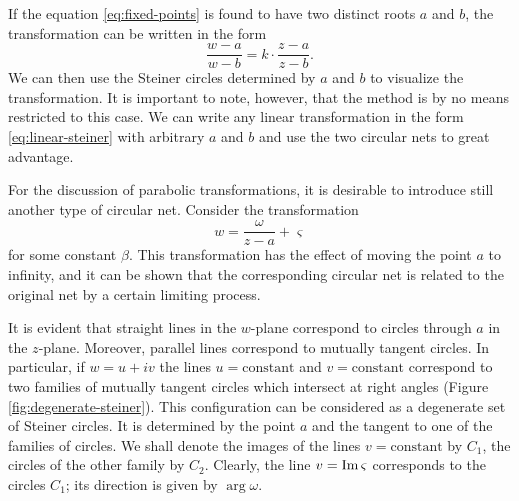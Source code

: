 If the equation \ref{eq:fixed-points} is found to have two distinct roots $a$ and $b$, the transformation can be written in the form $$\dfrac{w-a}{w-b}=k \cdot \dfrac{z-a}{z-b}.$$ We can then use the Steiner circles determined by $a$ and $b$ to visualize the transformation. It is important to note, however, that the method is by no means restricted to this case. We can write any linear transformation in the form \ref{eq:linear-steiner} with arbitrary $a$ and $b$ and use the two circular nets to great advantage.

For the discussion of parabolic transformations, it is desirable to introduce still another type of circular net. Consider the transformation $$w=\dfrac{\omega}{z-a}+\varsigma$$ for some constant $\beta$. This transformation has the effect of moving the point $a$ to infinity, and it can be shown that the corresponding circular net is related to the original net by a certain limiting process.

It is evident that straight lines in the $w$-plane correspond to circles through $a$ in the $z$-plane. Moreover, parallel lines correspond to mutually tangent circles. In particular, if $w=u+iv$ the lines $u=\text{constant}$ and $v=\text{constant}$ correspond to two families of mutually tangent circles which intersect at right angles (Figure \ref{fig:degenerate-steiner}). This configuration can be considered as a degenerate set of Steiner circles. It is determined by the point $a$ and the tangent to one of the families of circles. We shall denote the images of the lines $v=\text{constant}$ by $C_1$, the circles of the other family by $C_2$. Clearly, the line $v=\operatorname{Im} \varsigma$ corresponds to the circles $C_1$; its direction is given by $\arg \omega$.

